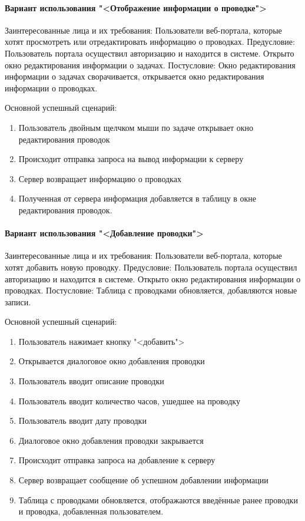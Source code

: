 \paragraph{Вариант использования "<Отображение информации о проводке">}
Заинтересованные лица и их требования: Пользователи веб-портала, которые хотят просмотреть или отредактировать информацию о проводках.
Предусловие: Пользователь портала осуществил авторизацию и находится в системе. Открыто окно редактирования информации о задачах.
Постусловие: Окно редактирования информации о задачах сворачивается, открывается окно редактирования информации о проводках.

Основной успешный сценарий:
\begin{enumerate}
	\item Пользователь двойным щелчком мыши по задаче открывает окно редактирования проводок
	\item Происходит отправка запроса на вывод информации к серверу 
	\item Сервер возвращает информацию о проводках
	\item Полученная от сервера информация добавляется в таблицу в окне редактирования проводок.
\end{enumerate}

\paragraph{Вариант использования "<Добавление проводки">}
Заинтересованные лица и их требования: Пользователи веб-портала, которые хотят добавить новую проводку.
Предусловие: Пользователь портала осуществил авторизацию и находится в системе. Открыто окно редактирования информации о проводках.
Постусловие: Таблица с проводками обновляется, добавляются новые записи.

Основной успешный сценарий:
\begin{enumerate}
	\item Пользователь нажимает кнопку "<добавить">
	\item Открывается диалоговое окно добавления проводки
	\item Пользователь вводит описание проводки
	\item Пользователь вводит количество часов, ушедшее на проводку
	\item Пользователь вводит дату проводки
	\item Диалоговое окно добавления проводки закрывается
	\item Происходит отправка запроса на добавление к серверу 
	\item Сервер возвращает сообщение об успешном добавлении информации
	\item Таблица с проводками обновляется, отображаются введённые ранее проводки и проводка, добавленная пользователем.
\end{enumerate}

